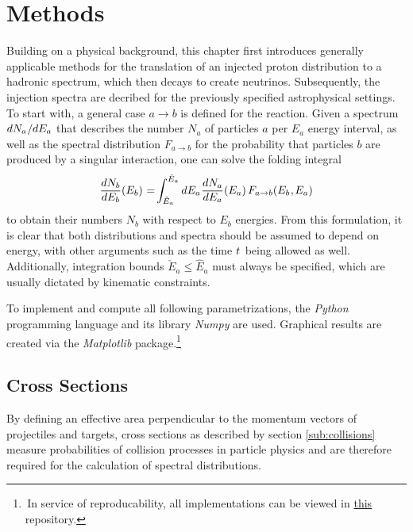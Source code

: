 \chapter{Methods}
\label{ch:methods}

Building on a physical background, this chapter first introduces generally applicable methods for the translation of an
injected proton distribution to a hadronic spectrum, which then decays to create neutrinos. Subsequently, the injection
spectra are decribed for the previously specified astrophysical settings. To start with, a general case $a \rightarrow b$
is defined for the reaction. Given a spectrum $dN_a \kern+0.5pt / \kern-0.25pt dE_a$ that describes the number $N_a$ of
particles $a$ per $E_a$ energy interval, as well as the spectral distribution $F_{a \rightarrow b}$ for the probability
that particles $b$ are produced by a singular interaction, one can solve the folding integral
\begin{equation}
	\frac{dN_b}{\raisebox{0.5ex}{$dE_b$}} (E_b) \kern+0.5pt = \kern-1.5pt\int_{\check{E}_a}^{\hat{E}_a} dE_a
	\kern+0.5pt \frac{dN_a}{\raisebox{0.5ex}{$dE_a$}} (E_a) \kern+1.5pt F_{a \rightarrow b} (E_b \kern+0.5pt, \kern-0.5pt E_a)
	\label{eqn:folding}
\end{equation}
to obtain their numbers $N_b$ with respect to $E_b$ energies. From this formulation, it is clear that both distributions
and spectra should be assumed to depend on energy, with other arguments such as the time $t \kern+0.5pt$ being allowed as
well. Additionally, integration bounds $\check{E}_a \leq \hat{E}_a$ must always be specified, which are usually dictated by
kinematic constraints.

To implement and compute all following parametrizations, the \emph{Python} programming language and its library \emph{Numpy}
are used. Graphical results are created via the \emph{Matplotlib} package.\footnote{$\,$In service of reproducability, all
implementations can be viewed in \href{https://github.com/fritzali/bachelor}{this} repository.}


\section{Cross Sections}
\label{sec:cross}

By defining an effective area perpendicular to the momentum vectors of projectiles and targets, cross sections as described
by section \ref{sub:collisions} measure probabilities of collision processes in particle physics and are therefore required
for the calculation of spectral distributions. 



